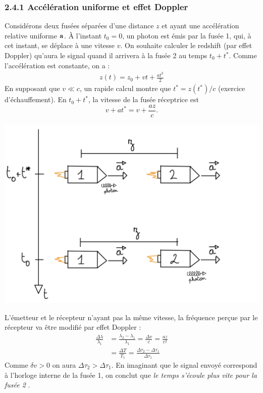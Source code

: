 \subsubsection{2.4.1 Accélération uniforme et effet Doppler}
Considérons deux fusées séparées d'une distance $z$ et ayant une accélération relative uniforme $\bm{\mathrm{a}}$. À l'instant $t_0=0$, un photon est émis par la fusée 1, qui, à cet instant, se déplace à une vitesse $v$. On souhaite calculer le redshift (par effet Doppler) qu'aura le signal quand il arrivera à la fusée 2 au temps $t_0 + t^*$. Comme l'accélération est constante, on a :
\begin{align}
    z(t) = z_0 + vt + \frac{at^2}{2}
\end{align}
En supposant que $v \ll c$, un rapide calcul montre que $t^* = z(t^*)/c$ (exercice d'échauffement). En $t_0+t^*$, la vitesse de la fusée réceptrice est 
\begin{equation}
    v+at^*=v+\frac{az}{c}.
\end{equation}

\begin{center}
\includegraphics[scale=0.3]{Chapitres/1. Introduction/Images/photon.png}
\end{center}
L'émetteur et le récepteur n'ayant pas la même vitesse, la fréquence perçue par le récepteur va être modifié par effet Doppler :
\begin{align}
    \frac{\Delta\lambda}{\lambda_1}& = \frac{\lambda_2 - \lambda_1}{\lambda_1} = \frac{\Delta v}{c} = \frac{az}{c^2} \\
    &= \frac{\Delta T}{T_1} =\frac{\Delta \tau_2 - \Delta \tau_1}{\Delta \tau_1}
\end{align}
Comme $\delta v > 0$ on aura $\Delta \tau_2 > \Delta \tau_1$. En imaginant que le signal envoyé correspond à l'horloge interne de la fusée 1, on conclut que \emph{le temps s'écoule plus vite pour la fusée 2} . 

